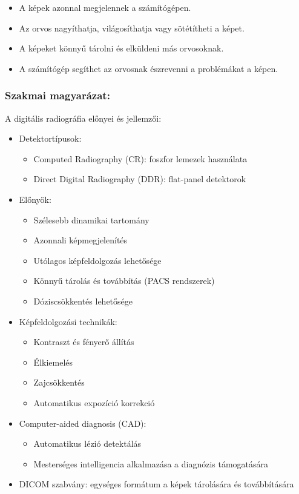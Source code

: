 \documentclass[a4paper,12pt]{article}
\begin{document}
\begin{itemize} \item A képek azonnal megjelennek a számítógépen. \item Az orvos nagyíthatja, világosíthatja vagy sötétítheti a képet. \item A képeket könnyű tárolni és elküldeni más orvosoknak. \item A számítógép segíthet az orvosnak észrevenni a problémákat a képen. \end{itemize}

\subsubsection{Szakmai magyarázat:} A digitális radiográfia előnyei és jellemzői:

\begin{itemize} \item Detektortípusok: \begin{itemize} \item Computed Radiography (CR): foszfor lemezek használata \item Direct Digital Radiography (DDR): flat-panel detektorok \end{itemize} \item Előnyök: \begin{itemize} \item Szélesebb dinamikai tartomány \item Azonnali képmegjelenítés \item Utólagos képfeldolgozás lehetősége \item Könnyű tárolás és továbbítás (PACS rendszerek) \item Dóziscsökkentés lehetősége \end{itemize} \item Képfeldolgozási technikák: \begin{itemize} \item Kontraszt és fényerő állítás \item Élkiemelés \item Zajcsökkentés \item Automatikus expozíció korrekció \end{itemize} \item Computer-aided diagnosis (CAD): \begin{itemize} \item Automatikus lézió detektálás \item Mesterséges intelligencia alkalmazása a diagnózis támogatására \end{itemize} \item DICOM szabvány: egységes formátum a képek tárolására és továbbítására \end{itemize}
\end{document}
